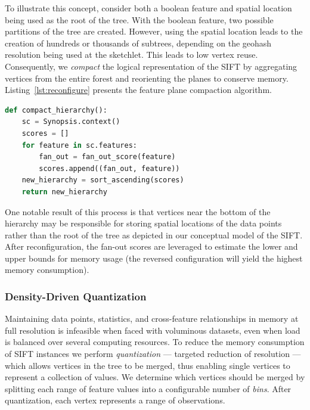 To illustrate this concept, consider both a boolean feature and spatial location being used as the root of the tree. With the boolean feature, two possible partitions of the tree are created. However, using the spatial location leads to the creation of hundreds or thousands of subtrees, depending on the geohash resolution being used at the sketchlet. This leads to low vertex reuse. Consequently, we \emph{compact} the logical representation of the SIFT by aggregating vertices from the entire forest and reorienting the planes to conserve memory. Listing~\ref{lst:reconfigure} presents the feature plane compaction algorithm.

\begin{lstlisting}[language=Python,style=custompy,emph={fan_out_score,compact_hierarchy},caption={Feature plane compaction algorithm; the hierarchy is reconfigured based on sorted fan-out scores.},label={lst:reconfigure}]
def compact_hierarchy():
    sc = Synopsis.context()
    scores = []
    for feature in sc.features:
        fan_out = fan_out_score(feature)
        scores.append((fan_out, feature))
    new_hierarchy = sort_ascending(scores)
    return new_hierarchy
\end{lstlisting}

One notable result of this process is that vertices near the bottom of the hierarchy may be responsible for storing spatial locations of the data points rather than the root of the tree as depicted in our conceptual model of the SIFT.  After reconfiguration, the fan-out scores are leveraged to estimate the lower and upper bounds for memory usage (the reversed configuration will yield the highest memory consumption).

\subsubsection{Density-Driven Quantization}
Maintaining data points, statistics, and cross-feature relationships in memory at full resolution is infeasible when faced with voluminous datasets, even when load is balanced over several computing resources. To reduce the memory consumption of SIFT instances we perform \emph{quantization} --- targeted reduction of resolution --- which allows vertices in the tree to be merged, thus enabling single vertices to represent a collection of values. We determine which vertices should be merged by splitting each range of feature values into a configurable number of \emph{bins}. After quantization, each vertex represents a range of observations.

